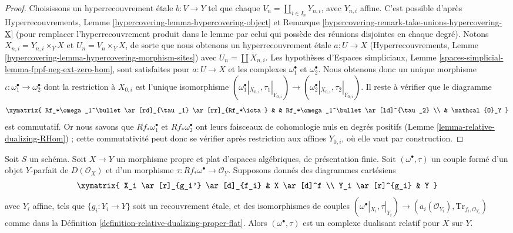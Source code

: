 \begin{proof}
\medskip\noindent
Choisissons un hyperrecouvrement \'etale $b : V \to Y$ tel que chaque
$V_n = \coprod_{i \in I_n} Y_{n, i}$, avec $Y_{n, i}$ affine.
C'est possible d'après Hyperrecouvrements, Lemme
\ref{hypercovering-lemma-hypercovering-object} et
Remarque \ref{hypercovering-remark-take-unions-hypercovering-X}
(pour remplacer l'hyperrecouvrement produit
dans le lemme par celui qui possède des réunions disjointes en chaque degré).
Notons $X_{n, i} = Y_{n, i} \times_Y X$ et $U_n = V_n \times_Y X$,
de sorte que nous obtenons un hyperrecouvrement \'etale
$a : U \to X$ (Hyperrecouvrements, Lemme
\ref{hypercovering-lemma-hypercovering-morphism-sites})
avec $U_n = \coprod X_{n, i}$.
Les hypothèses d'Espaces simpliciaux, Lemme
\ref{spaces-simplicial-lemma-fppf-neg-ext-zero-hom},
sont satisfaites pour $a : U \to X$ et les complexes
$\omega_1^\bullet$ et $\omega_2^\bullet$.
Nous obtenons donc un unique morphisme
$\iota : \omega_1^\bullet \to \omega_2^\bullet$
dont la restriction à $X_{0, i}$ est l'unique
isomorphisme $(\omega_1^\bullet|_{X_{0, i}}, \tau_1|_{Y_{0, i}}) \to
(\omega_2^\bullet|_{X_{0, i}}, \tau_2|_{Y_{0, i}})$.
Il reste à vérifier que le diagramme
$$
\xymatrix{
Rf_*\omega_1^\bullet \ar[rd]_{\tau_1} \ar[rr]_{Rf_*\iota} & &
Rf_*\omega_1^\bullet \ar[ld]^{\tau_2} \\
& \mathcal{O}_Y
}
$$
est commutatif. Or nous savons que $Rf_*\omega_1^\bullet$ et
$Rf_*\omega_2^\bullet$ ont leurs faisceaux de cohomologie nuls en degrés
positifs (Lemme \ref{lemma-relative-dualizing-RHom}) ;
cette commutativité peut donc se vérifier après
restriction aux affines $Y_{0, i}$, où elle vaut par construction.
\end{proof}

\begin{lemma}
\label{lemma-covering-enough}
Soit $S$ un schéma. Soit $X \to Y$ un morphisme propre et plat
d'espaces algébriques, de présentation finie.
Soit $(\omega^\bullet, \tau)$ un couple formé
d'un objet $Y$-parfait de $D(\mathcal{O}_X)$ et d'un morphisme
$\tau : Rf_*\omega^\bullet \to \mathcal{O}_Y$.
Supposons donnés des diagrammes cartésiens
$$
\xymatrix{
X_i \ar[r]_{g_i'} \ar[d]_{f_i} & X \ar[d]^f \\
Y_i \ar[r]^{g_i} & Y
}
$$
avec $Y_i$ affine, tels que $\{g_i : Y_i \to Y\}$ soit un recouvrement \'etale,
et des isomorphismes de couples $(\omega^\bullet|_{X_i}, \tau|_{Y_i})
\to (a_i(\mathcal{O}_{Y_i}), \text{Tr}_{f_i, \mathcal{O}_{Y_i}})$
comme dans la Définition \ref{definition-relative-dualizing-proper-flat}.
Alors $(\omega^\bullet, \tau)$ est un complexe dualisant relatif pour $X$ sur $Y$.
\end{lemma}

